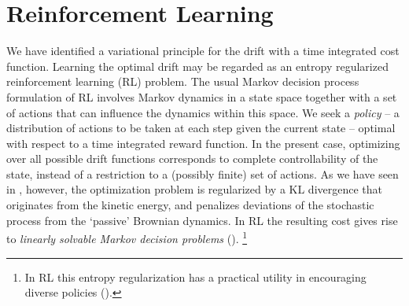 \documentclass[12pt]{msml2020} %
\begin{document}












\section{Reinforcement Learning}\label{sec:rl}

We have identified a variational principle for the drift with a time integrated cost function. Learning the optimal drift may be regarded as an entropy regularized reinforcement learning (RL) problem. The usual Markov decision process formulation of RL involves Markov dynamics in a state space together with a set of actions that can influence the dynamics within this space. We seek a \emph{policy} -- a distribution of actions to be taken at each step given the current state -- optimal with respect to a time integrated reward function. In the present case, optimizing over all possible drift functions corresponds to complete controllability of the state, instead of a restriction to a (possibly finite) set of actions. As we have seen in , however, the optimization problem is regularized by a KL divergence that originates from the kinetic energy, and penalizes deviations of the stochastic process from the `passive' Brownian dynamics. In RL the resulting cost gives rise to \emph{linearly solvable Markov decision problems} (\cite{Todorov:2007aa,Todorov:2008aa}). \footnote{In RL this entropy regularization has a practical utility in encouraging diverse policies (\cite{Levine:2018aa}).}
\end{document}
